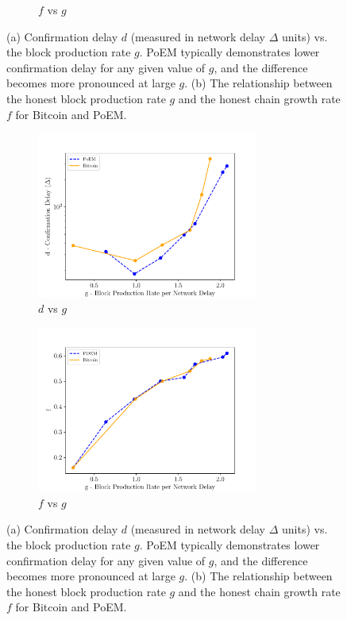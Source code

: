 \begin{figure}[h]
\begin{subfigure}{0.49\textwidth}
    \caption{$f$ vs $g$}
    \label{fig:fg}
    \end{subfigure}
    \caption{(a) Confirmation delay $d$ (measured in network delay $\Delta$ units) vs. the block production rate $g$. PoEM typically demonstrates lower confirmation delay for any given value of $g$, and the difference becomes more pronounced at large $g$. (b) The relationship between the honest block production rate $g$ and the honest chain growth rate $f$ for Bitcoin and PoEM.}
    \label{fig:results}
\end{figure}
\else
\begin{figure}[pt]
    \centering
    \begin{subfigure}{0.98\textwidth}
    \centering
    \includegraphics[width = 0.8\textwidth]{figures/dvsg.pdf}
    \caption{$d$ vs $g$}
    \label{fig:dvsg}
    \end{subfigure}
    \begin{subfigure}{0.98\textwidth}
    \centering
    \includegraphics[width = 0.8\textwidth]{figures/fvg.pdf}
    \caption{$f$ vs $g$}
    \label{fig:fg}
    \end{subfigure}
    \caption{(a) Confirmation delay $d$ (measured in network delay $\Delta$ units) vs. the block production rate $g$. PoEM typically demonstrates lower confirmation delay for any given value of $g$, and the difference becomes more pronounced at large $g$. (b) The relationship between the honest block production rate $g$ and the honest chain growth rate $f$ for Bitcoin and PoEM.}
    \label{fig:results}
\end{figure}
\fi

